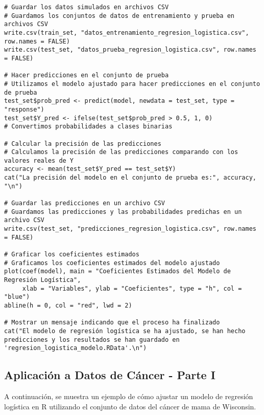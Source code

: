 \begin{verbatim}
# Guardar los datos simulados en archivos CSV
# Guardamos los conjuntos de datos de entrenamiento y prueba en archivos CSV
write.csv(train_set, "datos_entrenamiento_regresion_logistica.csv", row.names = FALSE)
write.csv(test_set, "datos_prueba_regresion_logistica.csv", row.names = FALSE)

# Hacer predicciones en el conjunto de prueba
# Utilizamos el modelo ajustado para hacer predicciones en el conjunto de prueba
test_set$prob_pred <- predict(model, newdata = test_set, type = "response")
test_set$Y_pred <- ifelse(test_set$prob_pred > 0.5, 1, 0)  
# Convertimos probabilidades a clases binarias

# Calcular la precisión de las predicciones
# Calculamos la precisión de las predicciones comparando con los valores reales de Y
accuracy <- mean(test_set$Y_pred == test_set$Y)
cat("La precisión del modelo en el conjunto de prueba es:", accuracy, "\n")

# Guardar las predicciones en un archivo CSV
# Guardamos las predicciones y las probabilidades predichas en un archivo CSV
write.csv(test_set, "predicciones_regresion_logistica.csv", row.names = FALSE)

# Graficar los coeficientes estimados
# Graficamos los coeficientes estimados del modelo ajustado
plot(coef(model), main = "Coeficientes Estimados del Modelo de Regresión Logística", 
     xlab = "Variables", ylab = "Coeficientes", type = "h", col = "blue")
abline(h = 0, col = "red", lwd = 2)

# Mostrar un mensaje indicando que el proceso ha finalizado
cat("El modelo de regresión logística se ha ajustado, se han hecho predicciones y los resultados se han guardado en 'regresion_logistica_modelo.RData'.\n")
\end{verbatim}

\subsection{Aplicación a Datos de Cáncer - Parte I}

A continuación, se muestra un ejemplo de cómo ajustar un modelo de regresión logística en R utilizando el conjunto de datos del cáncer de mama de Wisconsin.

